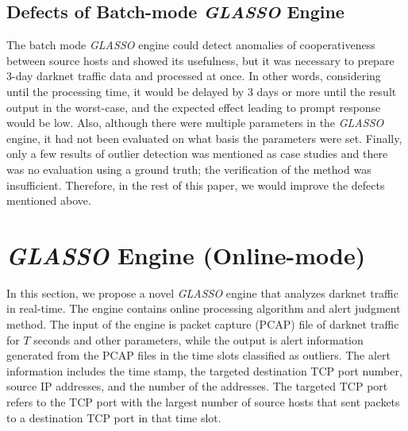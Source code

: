 \documentclass[conference]{IEEEtran}
\begin{document}
\subsection{Defects of Batch-mode {\it GLASSO} Engine}
The batch mode {\it GLASSO} engine could detect anomalies of cooperativeness between source hosts and showed its usefulness, but it was necessary to prepare 3-day darknet traffic data and processed at once.
In other words, considering until the processing time, it would be delayed by 3 days or more until the result output in the worst-case, and the expected effect leading to prompt response would be low.
Also, although there were multiple parameters in the {\it GLASSO} engine, it had not been evaluated on what basis the parameters were set.
Finally, only a few results of outlier detection was mentioned as case studies and there was no evaluation using a ground truth; the verification of the method was insufficient.
Therefore, in the rest of this paper, we would improve the defects mentioned above.



\section{{\it GLASSO} Engine (Online-mode)}
In this section, we propose a novel {\it GLASSO} engine that analyzes darknet traffic in real-time.
The engine contains online processing algorithm and alert judgment method.
The input of the engine is packet capture (PCAP) file of darknet traffic for $T$ seconds and other parameters, while the output is alert information generated from the PCAP files in the time slots classified as outliers.
The alert information includes the time stamp, the targeted destination TCP port number, source IP addresses, and the number of the addresses.
The targeted TCP port refers to the TCP port with the largest number of source hosts that sent packets to a destination TCP port in that time slot.


\end{document}
